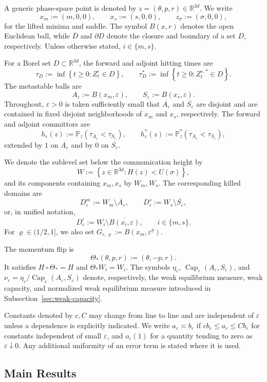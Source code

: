 \documentclass[11pt]{article}
\numberwithin{equation}{section}
\theoremstyle{plain}
\theoremstyle{definition}
\theoremstyle{remark}
\newcommand{\R}{\mathbb R}
\newcommand{\eps}{\varepsilon}
\renewcommand{\Cap}{\operatorname{Cap}}
\newcommand{\Pbb}{\mathbb P}
\begin{document}
A generic phase-space point is denoted by
$z=(\theta,p,r)\in\R^{3d}$.  We write
\[
x_m:=(m,0,0),\qquad x_s:=(s,0,0),\qquad
z_\sigma:=(\sigma,0,0),
\]
for the lifted minima and saddle.  The symbol $B(x,r)$ denotes the open
Euclidean ball, while $\overline D$ and $\partial D$ denote the closure and
boundary of a set $D$, respectively.  Unless otherwise stated,
$i\in\{m,s\}$.

For a Borel set $D\subset\R^{3d}$, the forward and adjoint hitting times are
\[
\tau_D:=\inf\left\{t\ge0:Z_t^\eps\in D\right\},\qquad
\tau_D^*:=\inf\left\{t\ge0:Z_t^{\eps,*}\in D\right\}.
\]
The metastable balls are
\[
A_\eps:=B(x_m,\eps),\qquad S_\eps:=B(x_s,\eps).
\]
Throughout, $\eps>0$ is taken sufficiently small that
$\overline{A_\eps}$ and $\overline{S_\eps}$ are disjoint and are contained in
fixed disjoint neighborhoods of $x_m$ and $x_s$, respectively.
The forward and adjoint committors are
\[
h_\eps(z):=\Pbb_z\left(\tau_{A_\eps}<\tau_{S_\eps}\right),\qquad
h_\eps^*(z):=\Pbb_z^*\left(\tau_{A_\eps}<\tau_{S_\eps}\right),
\]
extended by $1$ on $\overline{A_\eps}$ and by $0$ on
$\overline{S_\eps}$.

We denote the sublevel set below the communication height by
\[
W:=\left\{z\in\R^{3d}:H(z)<U(\sigma)\right\},
\]
and its components containing $x_m,x_s$ by $W_m,W_s$.  The corresponding
killed domains are
\[
D_\eps^m:=W_m\setminus\overline{A_\eps},\qquad
D_\eps^s:=W_s\setminus\overline{S_\eps},
\]
or, in unified notation,
\[
D_\eps^i:=W_i\setminus\overline{B(x_i,\eps)},\qquad i\in\{m,s\}.
\]
For $\varrho\in(1/2,1]$, we also set
$G_{\eps,\varrho}:=B(x_m,\eps^\varrho)$.

The momentum flip is
\[
\Theta_*(\theta,p,r):=(\theta,-p,r).
\]
It satisfies $H\circ\Theta_*=H$ and $\Theta_*W_i=W_i$.  The symbols
$\eta_\eps$, $\Cap_\eps(A_\eps,S_\eps)$, and
$\nu_\eps=\eta_\eps/\Cap_\eps(A_\eps,S_\eps)$ denote, respectively, the
weak equilibrium measure, weak capacity, and normalized weak equilibrium
measure introduced in Subsection~\ref{sec:weak-capacity}.

Constants denoted by $c,C$ may change from line to line and are independent
of $\eps$ unless a dependence is explicitly indicated.  We write $a_\eps\asymp b_\eps$
if $c b_\eps\le a_\eps\le Cb_\eps$ for constants independent of small
$\eps$, and $o_\eps(1)$ for a quantity tending to zero as
$\eps\downarrow0$.  Any additional uniformity of an error term is stated
where it is used.

\subsection{Main Results}
\end{document}
